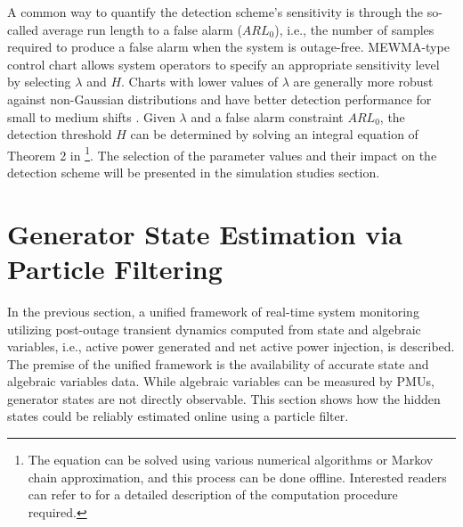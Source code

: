 A common way to quantify the detection scheme's sensitivity is through the so-called average run length to a false alarm ($ARL_0$), i.e., the number of samples required to produce a false alarm when the system is outage-free. MEWMA-type control chart allows system operators to specify an appropriate sensitivity level by selecting $\lambda$ and $H$. Charts with lower values of $\lambda$ are generally more robust against non-Gaussian distributions and have better detection performance for small to medium shifts \cite{montgomery2007introduction}. Given $\lambda$ and a false alarm constraint $ARL_0$, the detection threshold $H$ can be determined by solving an integral equation of Theorem 2 in \cite{rigdon1995integral}\footnote{The equation can be solved using various numerical algorithms or Markov chain approximation, and this process can be done offline. Interested readers can refer to \cite{knoth2017arl} for a detailed description of the computation procedure required.}. The selection of the parameter values and their impact on the detection scheme will be presented in the simulation studies section. 



\section{Generator State Estimation via Particle Filtering}
\label{ch4:sec:state_estimation}
In the previous section, a unified framework of real-time system monitoring utilizing post-outage transient dynamics computed from state and algebraic variables, i.e., active power generated and net active power injection, is described. The premise of the unified framework is the availability of accurate state and algebraic variables data. While algebraic variables can be measured by PMUs, generator states are not directly observable. This section shows how the hidden states could be reliably estimated online using a particle filter.

